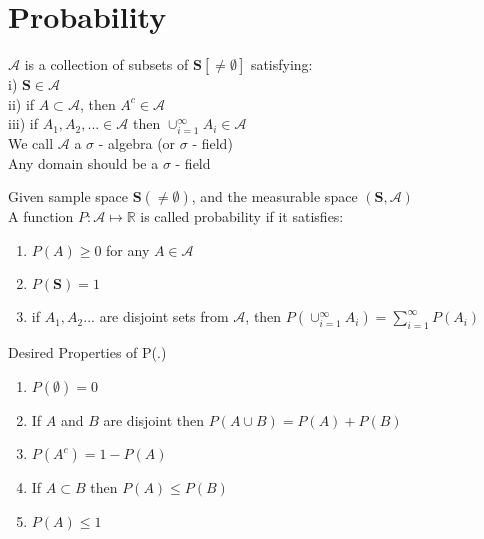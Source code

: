 \documentclass[14pt, oneside, letterpaper]{notes}
\begin{document}

%
%

\section*{Probability}
\begin{mydef}
	$\mathscr{A}$ is a collection of subsets of $\textbf{S}[\neq \emptyset]$
	satisfying: \\
	\indent i) $\textbf{S} \in \mathscr{A}$ \\
	\indent ii) if $ A \subset \mathscr{A}$, then $A^c \in \mathscr{A}$ \\
	\indent iii) if $A_1, A_2, ... \in \mathscr{A}$ then 
	$\cup_{i=1}^{\infty} A_i \in \mathscr{A} $ \\
	We call $\mathscr{A}$ a $\sigma$ - algebra (or $\sigma$ - field) \\
	Any domain should be a $\sigma$ - field
\end{mydef}

\begin{mydef}
	Given sample space $\textbf{S} (\neq \emptyset)$, and the 
	measurable space $(\textbf{S}, \mathscr{A})$ \\
	A function $P: \mathscr{A} \mapsto \mathbb{R}$ is called 
	probability if it satisfies:
	\begin{enumerate}
		\item $P(A) \geq 0$ for any $A \in \mathscr{A}$
		\item $P(\textbf{S}) = 1$
		\item if $A_1, A_2 ...$ are disjoint sets from $\mathscr{A}$,
		then $P(\cup_{i=1}^{\infty} A_i) = \sum_{i=1}^{\infty} P(A_i)$
	\end{enumerate}
\end{mydef}

\begin{remark}
Desired Properties of P(.)
\begin{enumerate}
	\item $P(\emptyset) = 0$
	\item If $A$ and $B$ are disjoint then $P(A \cup B) = P(A) + P(B)$
	\item $P(A^c) = 1- P(A)$
	\item If $A \subset B$ then $P(A) \leq P(B)$
	\item $P(A) \leq 1$
\end{enumerate}
\end{remark}
\end{document}

